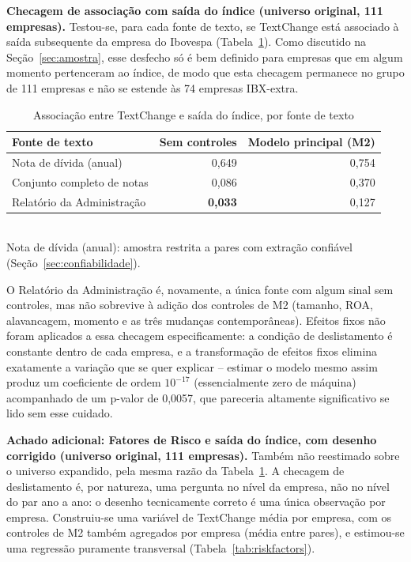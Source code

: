 \documentclass[a4paper,12pt]{report}
\begin{document}
\textbf{Checagem de associação com saída do índice (universo original, 111 empresas).} Testou-se, para cada fonte de texto, se TextChange está associado à saída subsequente da empresa do Ibovespa (Tabela~\ref{tab:delisting}). Como discutido na Seção~\ref{sec:amostra}, esse desfecho só é bem definido para empresas que em algum momento pertenceram ao índice, de modo que esta checagem permanece no grupo de 111 empresas e não se estende às 74 empresas IBX-extra.

\begin{table}[htbp]
    \centering
    \caption{Associação entre TextChange e saída do índice, por fonte de texto}
    \label{tab:delisting}
    \begin{tabular}{@{}lrr@{}}
        \toprule
        \textbf{Fonte de texto} & \textbf{Sem controles} & \textbf{Modelo principal (M2)} \\
        \midrule
        Nota de dívida (anual)      & 0,649 & 0,754 \\
        Conjunto completo de notas  & 0,086 & 0,370 \\
        Relatório da Administração  & \textbf{0,033} & 0,127 \\
        \bottomrule
    \end{tabular}
    \\[0.3cm]
    {\footnotesize Nota de dívida (anual): amostra restrita a pares com extração confiável (Seção~\ref{sec:confiabilidade}).}
\end{table}

O Relatório da Administração é, novamente, a única fonte com algum sinal sem controles, mas não sobrevive à adição dos controles de M2 (tamanho, ROA, alavancagem, momento e as três mudanças contemporâneas). Efeitos fixos não foram aplicados a essa checagem especificamente: a condição de deslistamento é constante dentro de cada empresa, e a transformação de efeitos fixos elimina exatamente a variação que se quer explicar -- estimar o modelo mesmo assim produz um coeficiente de ordem $10^{-17}$ (essencialmente zero de máquina) acompanhado de um p-valor de 0,0057, que pareceria altamente significativo se lido sem esse cuidado.

\textbf{Achado adicional: Fatores de Risco e saída do índice, com desenho corrigido (universo original, 111 empresas).} Também não reestimado sobre o universo expandido, pela mesma razão da Tabela~\ref{tab:delisting}. A checagem de deslistamento é, por natureza, uma pergunta no nível da empresa, não no nível do par ano a ano: o desenho tecnicamente correto é uma única observação por empresa. Construiu-se uma variável de TextChange média por empresa, com os controles de M2 também agregados por empresa (média entre pares), e estimou-se uma regressão puramente transversal (Tabela~\ref{tab:riskfactors}).
\end{document}
